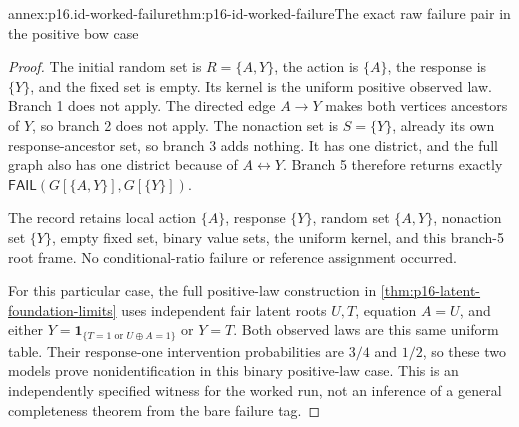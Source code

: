 \begin{annexitem}{annex:p16.id-worked-failure}{thm:p16-id-worked-failure}{The exact raw failure pair in the positive bow case}
\begin{proof}
The initial random set is \(R=\{A,Y\}\), the action is
\(\{A\}\), the response is \(\{Y\}\), and the fixed set
is empty. Its kernel is the uniform positive observed law. Branch 1
does not apply. The directed edge \(A\to Y\) makes both vertices
ancestors of \(Y\), so branch 2 does not apply. The nonaction
set is \(S=\{Y\}\), already its own response-ancestor set,
so branch 3 adds nothing. It has one district, and the full graph
also has one district because of \(A\leftrightarrow Y\).
Branch 5 therefore returns exactly
\(\mathsf{FAIL}(G[\{A,Y\}],G[\{Y\}])\).

The record retains local action \(\{A\}\), response \(\{Y\}\),
random set \(\{A,Y\}\), nonaction set \(\{Y\}\), empty
fixed set, binary value sets, the uniform kernel, and this branch-5
root frame. No conditional-ratio failure or reference assignment
occurred.

For this particular case, the full positive-law construction in
\cref{thm:p16-latent-foundation-limits} uses independent fair
latent roots \(U,T\), equation \(A=U\), and either
\(Y=\mathbf1_{\{T=1\text{ or }U\oplus A=1\}}\) or
\(Y=T\). Both observed laws are this same uniform table.
Their response-one intervention probabilities are \(3/4\) and
\(1/2\), so these two models prove nonidentification in this
binary positive-law case. This is an independently specified
witness for the worked run, not an inference of a general
completeness theorem from the bare failure tag.
\end{proof}
\end{annexitem}
